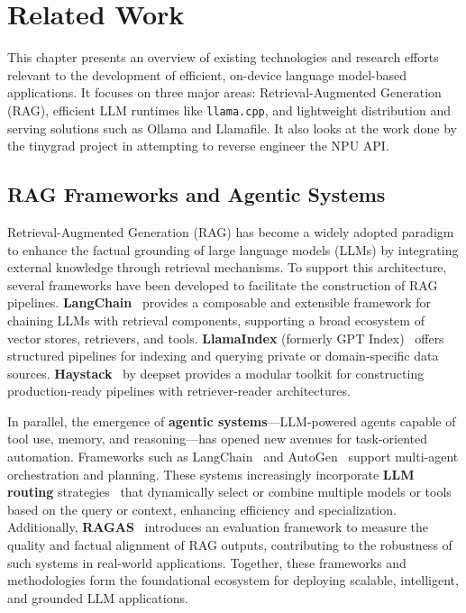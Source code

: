 \chapter{Related Work}

This chapter presents an overview of existing technologies and research efforts relevant to the development of efficient, on-device language model-based applications. It focuses on three major areas: Retrieval-Augmented Generation (RAG), efficient LLM runtimes like \texttt{llama.cpp}, and lightweight distribution and serving solutions such as Ollama and Llamafile. It also looks at the work done by the tinygrad project in attempting to reverse engineer the NPU API.


\section{RAG Frameworks and Agentic Systems}
\label{sec:RAG}

Retrieval-Augmented Generation (RAG) has become a widely adopted paradigm to enhance the factual grounding of large language models (LLMs) by integrating external knowledge through retrieval mechanisms. To support this architecture, several frameworks have been developed to facilitate the construction of RAG pipelines. \textbf{LangChain}~\cite{langchain} provides a composable and extensible framework for chaining LLMs with retrieval components, supporting a broad ecosystem of vector stores, retrievers, and tools. \textbf{LlamaIndex} (formerly GPT Index)~\cite{llamaindex} offers structured pipelines for indexing and querying private or domain-specific data sources. \textbf{Haystack}~\cite{haystack} by deepset provides a modular toolkit for constructing production-ready pipelines with retriever-reader architectures.

In parallel, the emergence of \textbf{agentic systems}—LLM-powered agents capable of tool use, memory, and reasoning—has opened new avenues for task-oriented automation. Frameworks such as LangChain~\cite{langchain} and AutoGen~\cite{autogen} support multi-agent orchestration and planning. These systems increasingly incorporate \textbf{LLM routing} strategies~\cite{gor2023router} that dynamically select or combine multiple models or tools based on the query or context, enhancing efficiency and specialization. Additionally, \textbf{RAGAS}~\cite{ragas} introduces an evaluation framework to measure the quality and factual alignment of RAG outputs, contributing to the robustness of such systems in real-world applications. Together, these frameworks and methodologies form the foundational ecosystem for deploying scalable, intelligent, and grounded LLM applications.

